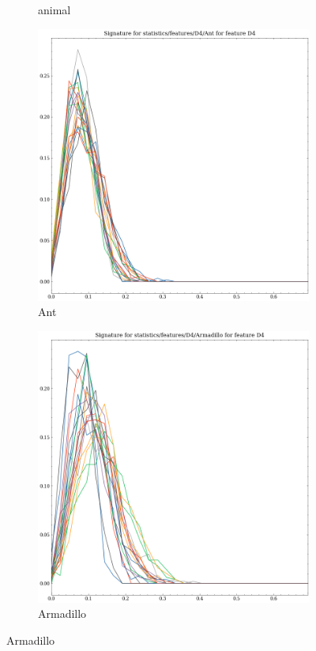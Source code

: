 \begin{figure}[t!p]
\begin{subfigure}[b]{0.23\textwidth}
        \caption{animal}    
    \end{subfigure}
    \hfill
    \begin{subfigure}[b]{0.23\textwidth}
        \includegraphics[width=\textwidth]{assets/feature_extraction/D4/Ant.png}
        \caption{Ant}
    \end{subfigure}
    \hfill    
    \begin{subfigure}[b]{0.23\textwidth}
        \includegraphics[width=\textwidth]{assets/feature_extraction/D4/Armadillo.png}
        \caption{Armadillo}
    \end{subfigure}
    \hfill
    

\end{figure}
